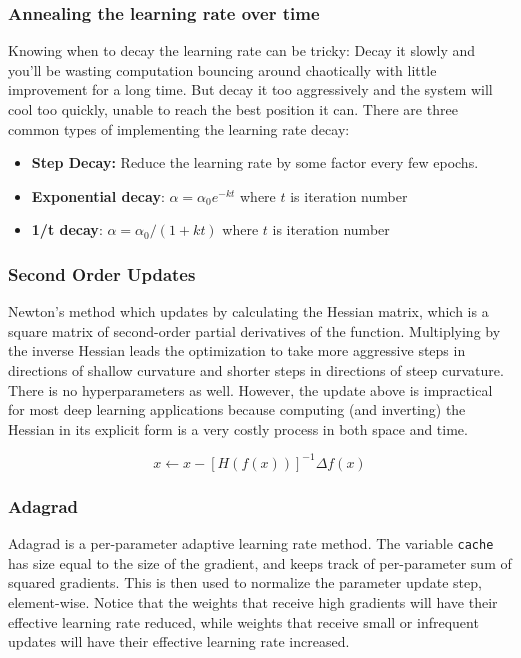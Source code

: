 \documentclass[letterpaper]{article}
\begin{document}
\subsubsection{Annealing the learning rate over time}

Knowing when to decay the learning rate can be tricky: Decay it slowly and you’ll be wasting computation bouncing around chaotically with little improvement for a long time. But decay it too aggressively and the system will cool too quickly, unable to reach the best position it can. There are three common types of implementing the learning rate decay:

\begin{itemize}
	\item \textbf{Step Decay:} Reduce the learning rate by some factor every few epochs.
	\item \textbf{Exponential decay}: \(\alpha = \alpha_0e^{-kt}\) where \(t\) is iteration number
	\item \textbf{1/t decay}: \(\alpha = \alpha_0/(1+kt)\) where \(t\) is iteration number
\end{itemize}

\subsubsection{Second Order Updates}

Newton's method which updates by calculating the Hessian matrix, which is a square matrix of second-order partial derivatives of the function. Multiplying by the inverse Hessian leads the optimization to take more aggressive steps in directions of shallow curvature and shorter steps in directions of steep curvature. There is no hyperparameters as well. However, the update above is impractical for most deep learning applications because computing (and inverting) the Hessian in its explicit form is a very costly process in both space and time.

\[x \leftarrow x - [H(f(x))]^{-1} \Delta f(x)\]

\subsubsection{Adagrad}

Adagrad is a per-parameter adaptive learning rate method. The variable \texttt{cache} has size equal to the size of the gradient, and keeps track of per-parameter sum of squared gradients. This is then used to normalize the parameter update step, element-wise. Notice that the weights that receive high gradients will have their effective learning rate reduced, while weights that receive small or infrequent updates will have their effective learning rate increased.\\
\end{document}
